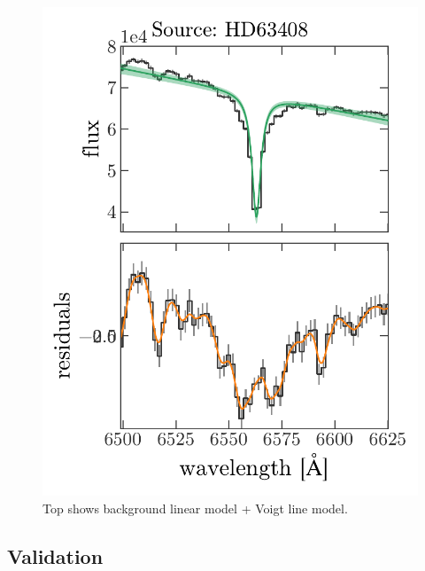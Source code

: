 \documentclass[modern, letterpaper]{aastex61}
\begin{document}
\begin{figure}[htbp]
  \begin{center}
    \includegraphics[width=\linewidth]{mcmc_example_fit.pdf}
  \end{center}
  \caption{%
    Top shows background linear model + Voigt line model.
    \label{fig:Halpha-mcmc-fit}}
\end{figure}

\subsection{Validation}
\end{document}
